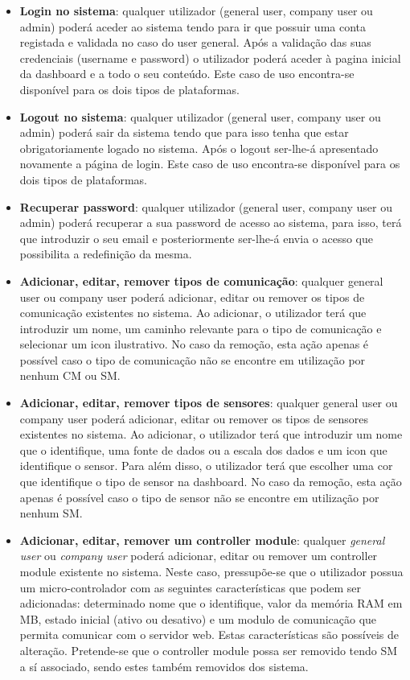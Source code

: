 \newpage
\begin{itemize}
	\item \textbf{Login no sistema}: qualquer utilizador (general user, company user ou admin) poderá aceder ao sistema tendo para ir que possuir uma conta registada e validada no caso do user general. Após a validação das suas credenciais (username e password) o utilizador poderá aceder à pagina inicial da dashboard e a todo o seu conteúdo. Este caso de uso encontra-se disponível para os dois tipos de plataformas. 
	
	
	\item \textbf{Logout no sistema}: qualquer utilizador (general user, company user ou admin) poderá sair da sistema tendo que para isso tenha que estar obrigatoriamente logado no sistema. Após o logout ser-lhe-á apresentado novamente a página de login. Este caso de uso encontra-se disponível para os dois tipos de plataformas. 
	
	
	\item \textbf{Recuperar password}: qualquer utilizador (general user, company user ou admin) poderá recuperar a sua password de acesso ao sistema, para isso, terá que introduzir o seu email e posteriormente ser-lhe-á envia o acesso que possibilita a redefinição da mesma. 
	
	
	
	\item \textbf{Adicionar, editar, remover tipos de comunicação}: qualquer general user ou company user poderá adicionar, editar ou remover os tipos de comunicação existentes no sistema. Ao  adicionar, o utilizador terá que introduzir um nome, um caminho relevante para o tipo de comunicação e selecionar um icon ilustrativo. No caso da remoção, esta ação apenas é possível caso o tipo de comunicação não se encontre em utilização por nenhum \ac{CM} ou \ac{SM}.  
	
	\item \textbf{Adicionar, editar, remover tipos de sensores}: qualquer general user ou company user poderá adicionar, editar ou remover os tipos de sensores existentes no sistema. Ao  adicionar, o utilizador terá que introduzir um nome que o identifique, uma fonte de dados ou a escala dos dados  e um icon que identifique o sensor. Para além disso, o utilizador terá que escolher uma cor que identifique o tipo de sensor na dashboard. No caso da remoção, esta ação apenas é possível caso o tipo de sensor não se encontre em utilização por nenhum \ac{SM}.   
	 
	
	\item \textbf{Adicionar, editar, remover um controller module}: qualquer \textit{general user} ou \textit{company user} poderá adicionar, editar ou remover um controller module existente no sistema. Neste caso, pressupõe-se que o utilizador possua um micro-controlador com as seguintes características que podem ser adicionadas: determinado nome que o identifique, valor da memória RAM em MB, estado inicial (ativo ou desativo) e um modulo de comunicação que permita comunicar com o servidor web. Estas características são possíveis de alteração. Pretende-se que o controller module possa ser removido tendo \ac{SM} a sí associado, sendo estes também removidos dos sistema. 



\end{itemize}
